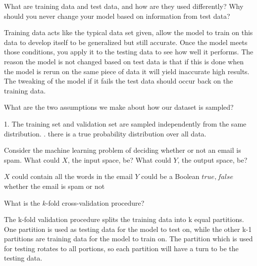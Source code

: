 \begin{problem}[2]
  What are training data and test data, and how are they used differently? Why should you never change your model based on information from test data?
\end{problem}
\begin{solution}
  Training data acts like the typical data set given, allow the model to train on this data to develop itself to be generalized but still accurate. Once the model meets those conditions, you apply it to the testing data to see how well it performs. The reason the model is not changed based on test data is that if this is done when the model is rerun on the same piece of data it will yield inaccurate high results. The tweaking of the model if it fails the test data should occur back on the training data. 
\end{solution}

\begin{problem}[2]
  What are the two assumptions we make about how our dataset is sampled?
\end{problem}
\begin{solution}
  1. The training set and validation set are sampled independently from the same distribution. . there is a true probability distribution over all data. 
\end{solution}

\begin{problem}[2]
  Consider the machine learning problem of deciding whether or not an email is spam. What could $X$, the input space, be? What could $Y$, the output space, be?
\end{problem}
\begin{solution}
  $X$ could contain all the words in the email\newline
  $Y$ could be a Boolean ${true, false}$ whether the email is spam or not
\end{solution}

\begin{problem}[2]
  What is the $k$-fold cross-validation procedure?
\end{problem}
\begin{solution}
  The k-fold validation procedure splits the training data into k equal partitions. One partition is used as testing data for the model to test on, while the other k-1 partitions are training data for the model to train on. The partition which is used for testing rotates to all portions, so each partition will have a turn to be the testing data. 
\end{solution}



